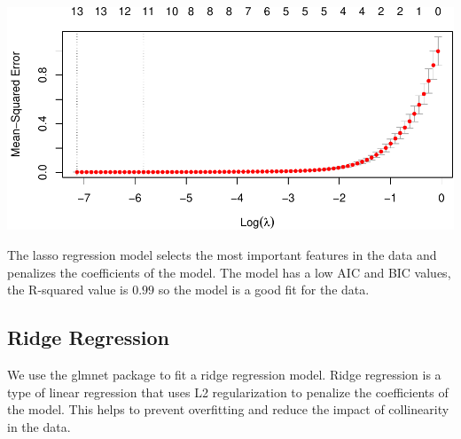 \documentclass[
]{article}
\newenvironment{Shaded}{\begin{snugshade}}{\end{snugshade}}
\newcommand{\AttributeTok}[1]{\textcolor[rgb]{0.13,0.29,0.53}{#1}}
\newcommand{\CommentTok}[1]{\textcolor[rgb]{0.56,0.35,0.01}{\textit{#1}}}
\newcommand{\ConstantTok}[1]{\textcolor[rgb]{0.56,0.35,0.01}{#1}}
\newcommand{\DecValTok}[1]{\textcolor[rgb]{0.00,0.00,0.81}{#1}}
\newcommand{\FunctionTok}[1]{\textcolor[rgb]{0.13,0.29,0.53}{\textbf{#1}}}
\newcommand{\NormalTok}[1]{#1}
\newcommand{\OtherTok}[1]{\textcolor[rgb]{0.56,0.35,0.01}{#1}}
\newcommand{\SpecialCharTok}[1]{\textcolor[rgb]{0.81,0.36,0.00}{\textbf{#1}}}
\newcommand{\StringTok}[1]{\textcolor[rgb]{0.31,0.60,0.02}{#1}}
\begin{document}
\begin{Shaded}
\end{Shaded}

\begin{center}\includegraphics{Statistical_Learning_Final_Report_files/figure-latex/lasso_regression-1} \end{center}

The lasso regression model selects the most important features in the
data and penalizes the coefficients of the model. The model has a low
AIC and BIC values, the R-squared value is \(0.99\) so the model is a
good fit for the data.

\subsection{Ridge Regression}\label{ridge-regression}

We use the glmnet package to fit a ridge regression model. Ridge
regression is a type of linear regression that uses L2 regularization to
penalize the coefficients of the model. This helps to prevent
overfitting and reduce the impact of collinearity in the data.
\end{document}
